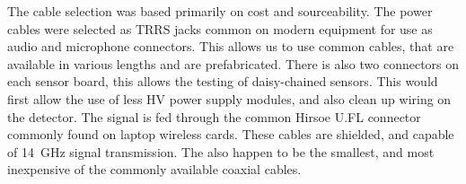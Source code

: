 \documentclass[]{Article}
\begin{document}
The cable selection was based primarily on cost and sourceability. The power cables were selected as TRRS jacks common on modern equipment for use as audio and microphone connectors. This allows us to use common cables, that are available in various lengths and are prefabricated. There is also two connectors on each sensor board, this allows the testing of daisy-chained sensors. This would first allow the use of less HV power supply modules, and also clean up wiring on the detector. The signal is fed through the common Hirsoe U.FL connector commonly found on laptop wireless cards. These cables are shielded, and capable of \SI{14}{\giga\hertz} signal transmission. The also happen to be the smallest, and most inexpensive of the commonly available coaxial cables.
	
\end{document}
